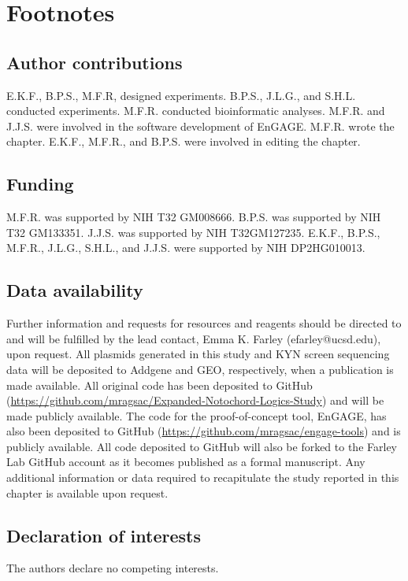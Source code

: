 \section{Footnotes}

\subsection{Author contributions}
E.K.F., B.P.S., M.F.R, designed experiments. B.P.S., J.L.G., and S.H.L. conducted experiments. M.F.R. conducted bioinformatic analyses. M.F.R. and J.J.S. were involved in the software development of EnGAGE. M.F.R. wrote the chapter. E.K.F., M.F.R., and B.P.S. were involved in editing the chapter. 

\subsection{Funding}
M.F.R. was supported by NIH T32 GM008666. B.P.S. was supported by NIH T32 GM133351. J.J.S. was supported by NIH T32GM127235. E.K.F., B.P.S., M.F.R., J.L.G., S.H.L., and J.J.S. were supported by NIH DP2HG010013.

\subsection{Data availability}
Further information and requests for resources and reagents should be directed to and will be fulfilled by the lead contact, Emma K. Farley (efarley@ucsd.edu), upon request. All plasmids generated in this study and KYN screen sequencing data will be deposited to Addgene and GEO, respectively, when a publication is made available. All original code has been deposited to GitHub (\href{https://github.com/mragsac/Expanded-Notochord-Logics-Study}{https://github.com/mragsac/Expanded-Notochord-Logics-Study}) and will be made publicly available. The code for the proof-of-concept tool, EnGAGE, has also been deposited to GitHub (\href{https://github.com/mragsac/engage-tools}{https://github.com/mragsac/engage-tools}) and is publicly available. All code deposited to GitHub will also be forked to the Farley Lab GitHub account as it becomes published as a formal manuscript. Any additional information or data required to recapitulate the study reported in this chapter is available upon request.

\subsection{Declaration of interests}
The authors declare no competing interests.
